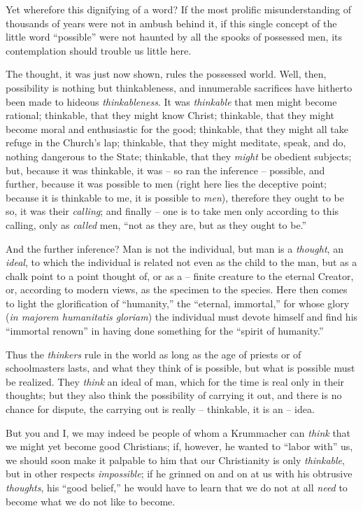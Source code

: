 Yet wherefore this dignifying of a word? If the most prolific misunderstanding 
of thousands of years were not in ambush behind it, if this single concept of 
the little word ``possible'' were not haunted by all the spooks of possessed 
men, its contemplation should trouble us little here.

The thought, it was just now shown, rules the possessed world. Well, then, 
possibility is nothing but thinkableness, and innumerable sacrifices have 
hitherto been made to hideous \textit{thinkableness}. It was 
\textit{thinkable} that men might become rational; thinkable, that they might 
know Christ; thinkable, that they might become moral and enthusiastic for the 
good; thinkable, that they might all take refuge in the Church's lap; 
thinkable, that they might meditate, speak, and do, nothing dangerous to the 
State; thinkable, that they \textit{might} be obedient subjects; but, because 
it was thinkable, it was -- so ran the inference -- possible, and further, 
because it was possible to men (right here lies the deceptive point; because 
it is thinkable to me, it is possible to \textit{men}), therefore they ought 
to be so, it was their \textit{calling}; and finally -- one is to take men 
only according to this calling, only as \textit{called} men, ``not as they 
are, but as they ought to be.''

And the further inference? Man is not the individual, but man is a 
\textit{thought}, an \textit{ideal}, to which the individual is related not 
even as the child to the man, but as a chalk point to a point thought of, or 
as a -- finite creature to the eternal Creator, or, according to modern views, 
as the specimen to the species. Here then comes to light the glorification of 
``humanity,'' the ``eternal, immortal,'' for whose glory (\textit{in 
majorem humanitatis gloriam}) the individual must devote himself and find his 
``immortal renown'' in having done something for the ``spirit of 
humanity.''

Thus the \textit{thinkers} rule in the world as long as the age of priests or 
of schoolmasters lasts, and what they think of is possible, but what is 
possible must be realized. They \textit{think} an ideal of man, which for the 
time is real only in their thoughts; but they also think the possibility of 
carrying it out, and there is no chance for dispute, the carrying out is 
really -- thinkable, it is an -- idea.

But you and I, we may indeed be people of whom a Krummacher can \textit{think} 
that we might yet become good Christians; if, however, he wanted to ``labor 
with'' us, we should soon make it palpable to him that our Christianity is 
only \textit{thinkable}, but in other respects \textit{impossible}; if he 
grinned on and on at us with his obtrusive \textit{thoughts}, his ``good 
belief,'' he would have to learn that we do not at all \textit{need} to 
become what we do not like to become.

